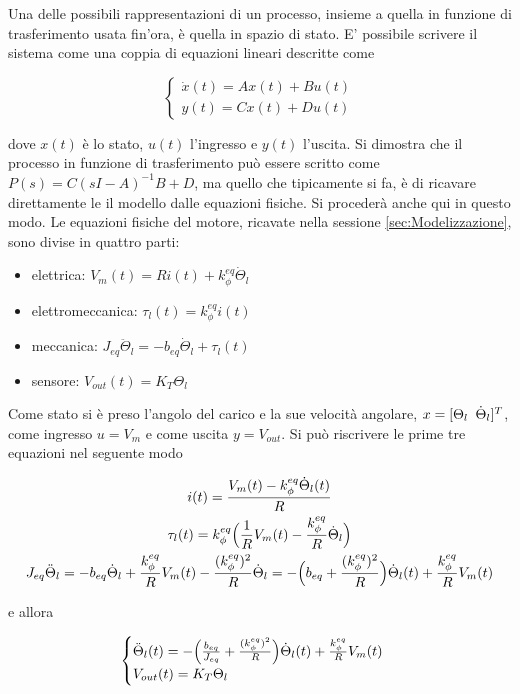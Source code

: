 	Una delle possibili rappresentazioni di un processo, insieme a quella in funzione di trasferimento usata fin'ora, è quella in spazio di stato. E' possibile scrivere il sistema come una coppia di equazioni lineari descritte come
		
	\begin{equation}
		\begin{cases}
			\dot{x}(t)=Ax(t)+Bu(t) \\
			y(t)=Cx(t)+Du(t)
		\end{cases}
	\end{equation}	
		
	\noindent dove $x(t)$ è lo stato, $u(t)$ l'ingresso e $y(t)$ l'uscita. Si dimostra che il processo in funzione di trasferimento può essere scritto come $P(s)=C(sI-A)^{-1}B+D$, ma quello che tipicamente si fa, è di ricavare direttamente le il modello dalle equazioni fisiche. Si procederà anche qui in questo modo. Le equazioni fisiche del motore, ricavate nella sessione \ref{sec:Modelizzazione}, sono divise in quattro parti:
		
	\begin{itemize}
		\item elettrica: $V_m(t)=Ri(t)+k_{\phi}^{eq}\dot{\Theta}_l$
		\item elettromeccanica: $\tau_l(t)=k_{\phi}^{eq}i(t)$
		\item meccanica: $J_{eq}\ddot{\Theta}_l=-b_{eq}\dot{\Theta}_l+\tau_l(t)$
		\item sensore: $V_{out}(t)=K_T\Theta_l$
	\end{itemize}  
		
	\noindent Come stato si è preso l'angolo del carico e la sue velocità angolare, $x=[\Theta_l \singleSpacing \dot{\Theta}_l]^T$, come ingresso $u=V_m$ e come uscita $y=V_{out}$. Si può riscrivere le prime tre equazioni nel seguente modo
		
	\begin{gather}
		i(t)=\frac{V_m(t)-k_{\phi}^{eq}\dot{\Theta}_l(t)}{R} \\
		\tau_l(t)=k_{\phi}^{eq}\Bigl(\frac{1}{R}V_m(t)-\frac{k_{\phi}^{eq}}{R}\dot{\Theta}_l\Bigl) \\
		J_{eq}\ddot{\Theta}_l=-b_{eq}\dot{\Theta}_l+\frac{k_{\phi}^{eq}}{R}V_m(t)-\frac{(k_{\phi}^{eq})^2}{R}\dot{\Theta}_l=-\Bigl(b_{eq}+\frac{(k_{\phi}^{eq})^2}{R}\Bigl)\dot{\Theta}_l(t)+\frac{k_{\phi}^{eq}}{R}V_m(t)
	\end{gather}  
		
	\noindent e allora
		
	\begin{equation}
		\begin{cases}
			\ddot{\Theta}_l(t)=-\Bigl(\frac{b_{eq}}{J_{eq}}+\frac{(k_{\phi}^{eq})^2}{R}\Bigl)\dot{\Theta}_l(t)+\frac{k_{\phi}^{eq}}{R}V_m(t) \\
			V_{out}(t)=K_T\Theta_l
		\end{cases}
	\end{equation}
		
